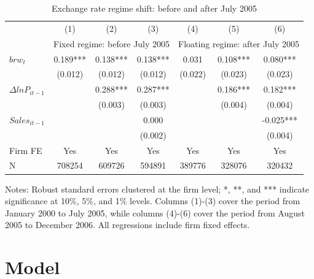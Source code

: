\begin{table}[htbp]
    \centering
    \caption{Exchange rate regime shift: before and after July 2005}
    \begin{threeparttable}
    \begin{tabular}{lcccccc}
        \toprule
        & (1)   & (2)   & (3)   & (4)   & (5)   & (6) \\
        & \multicolumn{3}{c}{Fixed regime: before July 2005} & \multicolumn{3}{c}{Floating regime: after July 2005}  \\
        \midrule
        $brw_t$   & 0.189*** & 0.138*** & 0.138*** & 0.031 & 0.108*** & 0.080*** \\
              & (0.012) & (0.012) & (0.012) & (0.022) & (0.023) & (0.023) \\
        $\Delta ln P_{it-1}$ &       & 0.288*** & 0.287*** &       & 0.186*** & 0.182*** \\
              &       & (0.003) & (0.003) &       & (0.004) & (0.004) \\
        $Sales_{it-1}$ &       &       & 0.000 &       &       & -0.025*** \\
              &       &       & (0.002) &       &       & (0.004) \\
        \midrule
        Firm FE & Yes   & Yes   & Yes   & Yes   & Yes   & Yes \\
        N     & 708254 & 609726 & 594891 & 389776 & 328076 & 320432 \\
        \bottomrule
    \end{tabular}
        \begin{tablenotes}
            \footnotesize
            \item Notes: Robust standard errors clustered at the firm level;  *, **, and *** indicate significance at 10\%, 5\%, and 1\% levels. Columns (1)-(3) cover the period from January 2000 to July 2005, while columns (4)-(6) cover the period from August 2005 to December 2006. All regressions include firm fixed effects.
	\end{tablenotes}
    \end{threeparttable}
    \label{tab.regime}
\end{table}

\newpage
\section{Model}

